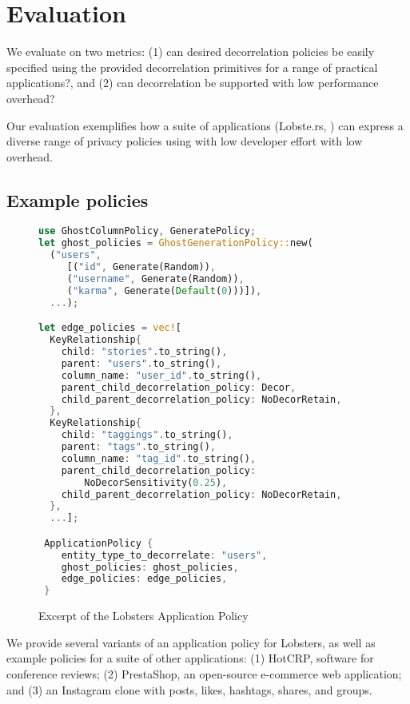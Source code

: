 \section{Evaluation}
We evaluate \sys{} on two metrics: (1) can desired decorrelation policies be easily specified using the
provided decorrelation primitives for a range of practical applications?, and (2) can decorrelation
be supported with low performance overhead?

Our evaluation exemplifies how a suite of applications (Lobste.rs, ) can express a diverse
range of privacy policies using \sys{} with low developer effort with low overhead.

\subsection{Example policies}
\begin{figure}
\begin{lstlisting}[language=Rust]
use GhostColumnPolicy, GeneratePolicy;
let ghost_policies = GhostGenerationPolicy::new(
  ("users", 
     [("id", Generate(Random)),
     ("username", Generate(Random)),
     ("karma", Generate(Default(0)))]),
  ...);

let edge_policies = vec![
  KeyRelationship{
    child: "stories".to_string(),
    parent: "users".to_string(),
    column_name: "user_id".to_string(),
    parent_child_decorrelation_policy: Decor,
    child_parent_decorrelation_policy: NoDecorRetain,
  },
  KeyRelationship{
    child: "taggings".to_string(),
    parent: "tags".to_string(),
    column_name: "tag_id".to_string(),
    parent_child_decorrelation_policy: 
        NoDecorSensitivity(0.25),
    child_parent_decorrelation_policy: NoDecorRetain,
  },
  ...];

 ApplicationPolicy {
    entity_type_to_decorrelate: "users",
    ghost_policies: ghost_policies,
    edge_policies: edge_policies,
 }
\end{lstlisting}
    \label{fig:policy}
    \caption{Excerpt of the Lobsters Application Policy}
\end{figure}
We provide several variants of an application policy for Lobsters, as well as example policies for a
suite of other applications: (1) HotCRP, software for conference reviews; (2) PrestaShop, an
open-source e-commerce web application; and (3) an Instagram clone with posts, likes, hashtags,
shares, and groups.

